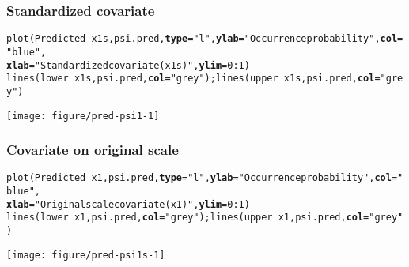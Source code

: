 \documentclass[color=usenames,dvipsnames]{beamer}\usepackage[]{graphicx}\usepackage[]{xcolor}
\makeatletter
\newcommand{\hlnum}[1]{\textcolor[rgb]{0.69,0.494,0}{#1}}%
\newcommand{\hlstr}[1]{\textcolor[rgb]{0.749,0.012,0.012}{#1}}%
\newcommand{\hlopt}[1]{\textcolor[rgb]{0,0,0}{#1}}%
\newcommand{\hlstd}[1]{\textcolor[rgb]{0,0,0}{#1}}%
\newcommand{\hlkwc}[1]{\textcolor[rgb]{0,0,0}{\textbf{#1}}}%
\newcommand{\hlkwd}[1]{\textcolor[rgb]{0.004,0.004,0.506}{#1}}%
\newenvironment{kframe}{%
 \def\at@end@of@kframe{}%
 \ifinner\ifhmode%
  \def\at@end@of@kframe{\end{minipage}}%
  \begin{minipage}{\columnwidth}%
 \fi\fi%
 \def\FrameCommand##1{\hskip\@totalleftmargin \hskip-\fboxsep
 \colorbox{shadecolor}{##1}\hskip-\fboxsep
     \hskip-\linewidth \hskip-\@totalleftmargin \hskip\columnwidth}%
 \MakeFramed {\advance\hsize-\width
   \@totalleftmargin\z@ \linewidth\hsize
   \@setminipage}}%
 {\par\unskip\endMakeFramed%
 \at@end@of@kframe}
\newenvironment{knitrout}{}{} %
\makeatother
\begin{document}
\begin{frame}[fragile]
  \frametitle{Standardized covariate}
\begin{knitrout}\tiny
{}\color{fgcolor}\begin{kframe}
\begin{alltt}
\hlkwd{plot}\hlstd{(Predicted} \hlopt{~} \hlstd{x1s, psi.pred,} \hlkwc{type}\hlstd{=}\hlstr{"l"}\hlstd{,} \hlkwc{ylab}\hlstd{=}\hlstr{"Occurrence probability"}\hlstd{,} \hlkwc{col}\hlstd{=}\hlstr{"blue"}\hlstd{,}
     \hlkwc{xlab}\hlstd{=}\hlstr{"Standardized covariate (x1s)"}\hlstd{,} \hlkwc{ylim}\hlstd{=}\hlnum{0}\hlopt{:}\hlnum{1}\hlstd{)}
\hlkwd{lines}\hlstd{(lower} \hlopt{~} \hlstd{x1s, psi.pred,} \hlkwc{col}\hlstd{=}\hlstr{"grey"}\hlstd{);} \hlkwd{lines}\hlstd{(upper} \hlopt{~} \hlstd{x1s, psi.pred,} \hlkwc{col}\hlstd{=}\hlstr{"grey"}\hlstd{)}
\end{alltt}
\end{kframe}

{\centering \texttt{[image: figure/pred-psi1-1]} 

}


\end{knitrout}
\end{frame}




\begin{frame}[fragile]
  \frametitle{Covariate on original scale}
\begin{knitrout}\tiny
{}\color{fgcolor}\begin{kframe}
\begin{alltt}
\hlkwd{plot}\hlstd{(Predicted} \hlopt{~} \hlstd{x1, psi.pred,} \hlkwc{type}\hlstd{=}\hlstr{"l"}\hlstd{,} \hlkwc{ylab}\hlstd{=}\hlstr{"Occurrence probability"}\hlstd{,} \hlkwc{col}\hlstd{=}\hlstr{"blue"}\hlstd{,}
     \hlkwc{xlab}\hlstd{=}\hlstr{"Original scale covariate (x1)"}\hlstd{,} \hlkwc{ylim}\hlstd{=}\hlnum{0}\hlopt{:}\hlnum{1}\hlstd{)}
\hlkwd{lines}\hlstd{(lower} \hlopt{~} \hlstd{x1, psi.pred,} \hlkwc{col}\hlstd{=}\hlstr{"grey"}\hlstd{);} \hlkwd{lines}\hlstd{(upper} \hlopt{~} \hlstd{x1, psi.pred,} \hlkwc{col}\hlstd{=}\hlstr{"grey"}\hlstd{)}
\end{alltt}
\end{kframe}

{\centering \texttt{[image: figure/pred-psi1s-1]} 

}


\end{knitrout}
\end{frame}
\end{document}
